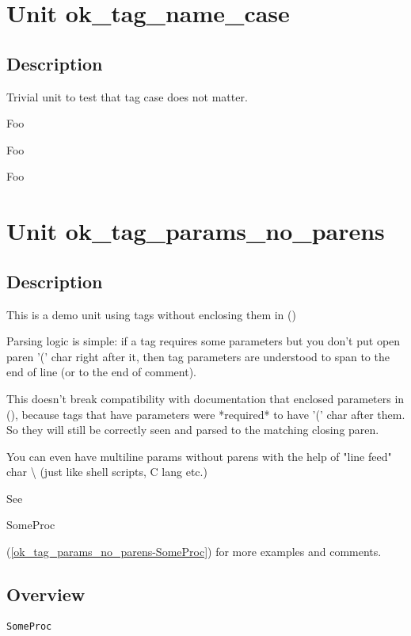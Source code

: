 \documentclass{report}
\begin{document}
\chapter{Unit ok{\_}tag{\_}name{\_}case}
\section{Description}
Trivial unit to test that tag case does not matter.

\begin{ttfamily}Foo\end{ttfamily}

\begin{ttfamily}Foo\end{ttfamily}

\begin{ttfamily}Foo\end{ttfamily}
\chapter{Unit ok{\_}tag{\_}params{\_}no{\_}parens}
\section{Description}
This is a demo unit using tags without enclosing them in ()\hfill\vspace*{1ex}



Parsing logic is simple: if a tag requires some parameters but you don't put open paren '(' char right after it, then tag parameters are understood to span to the end of line (or to the end of comment).

This doesn't break compatibility with documentation that enclosed parameters in (), because tags that have parameters were *required* to have '(' char after them. So they will still be correctly seen and parsed to the matching closing paren.

You can even have multiline params without parens with the help of "line feed" char {\textbackslash} (just like shell scripts, C lang etc.)

See \begin{ttfamily}SomeProc\end{ttfamily}(\ref{ok_tag_params_no_parens-SomeProc}) for more examples and comments.

   
\section{Overview}
\begin{description}
\item[\texttt{\begin{ttfamily}EFoo\end{ttfamily} Class}]
\end{description}
\begin{description}
\item[\texttt{SomeProc}]
\end{description}
\end{document}

